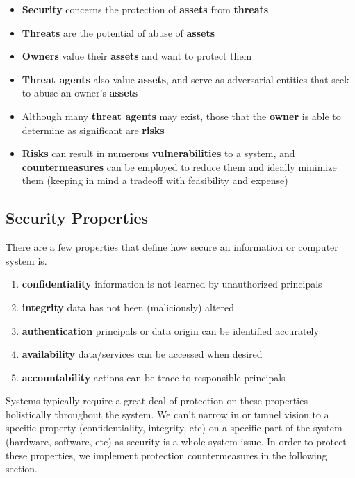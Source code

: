 \documentclass[11pt]{article}
\begin{document}
\begin{itemize}
    \item \textbf{Security} concerns the protection of \textbf{assets} from \textbf{threats}
    \item \textbf{Threats} are the potential of abuse of \textbf{assets}
    \item \textbf{Owners} value their \textbf{assets} and want to protect them
    \item \textbf{Threat agents} also value \textbf{assets}, and serve as adversarial entities that seek to abuse an owner's \textbf{assets}
    \item Although many \textbf{threat agents} may exist, those that the \textbf{owner} is able to determine as significant are \textbf{risks}
    \item \textbf{Risks} can result in numerous \textbf{vulnerabilities} to a system, and \textbf{countermeasures} can be employed to reduce them and ideally minimize them (keeping in mind a tradeoff with feasibility and expense)
\end{itemize}

\subsection{Security Properties}
There are a few properties that define how secure an information or computer system is.

\begin{enumerate}
    \item \textbf{confidentiality} information is not learned by unauthorized principals
    \item \textbf{integrity} data has not been (maliciously) altered
    \item \textbf{authentication} principals or data origin can be identified accurately
    \item \textbf{availability} data/services can be accessed when desired
    \item \textbf{accountability} actions can be trace to responsible principals
\end{enumerate}

Systems typically require a great deal of protection on these properties holistically throughout the system.
We can't narrow in or tunnel vision to a specific property (confidentiality, integrity, etc) on a specific part of the system (hardware, software, etc) as security is a whole system issue.
In order to protect these properties, we implement protection countermeasures in the following section.
\end{document}
